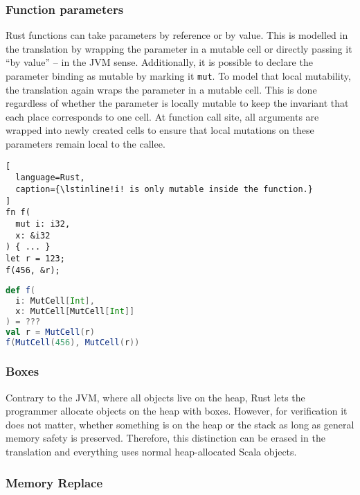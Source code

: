 \subsubsection{Function parameters}

Rust functions can take parameters by reference or by value. This is modelled in
the translation by wrapping the parameter in a mutable cell or directly passing
it ``by value'' -- in the JVM sense. Additionally, it is possible to declare the
parameter binding as mutable by marking it \passthrough{\lstinline!mut!}. To
model that local mutability, the translation again wraps the parameter in a
mutable cell. This is done regardless of whether the parameter is locally
mutable to keep the invariant that each place corresponds to one cell. At
function call site, all arguments are wrapped into newly created cells to ensure
that local mutations on these parameters remain local to the callee.

\noindent\begin{minipage}[t]{.45\textwidth}
\begin{lstlisting}[
  language=Rust,
  caption={\lstinline!i! is only mutable inside the function.}
]
fn f(
  mut i: i32,
  x: &i32
) { ... }
let r = 123;
f(456, &r);
\end{lstlisting}
\end{minipage}\hfill
\begin{minipage}[t]{.45\textwidth}
\begin{lstlisting}[language=Scala, caption={This results in nested cell in Scala.}]
def f(
  i: MutCell[Int],
  x: MutCell[MutCell[Int]]
) = ???
val r = MutCell(r)
f(MutCell(456), MutCell(r))
\end{lstlisting}
\end{minipage}

\subsubsection{Boxes}

Contrary to the JVM, where all objects live on the heap, Rust lets the
programmer allocate objects on the heap with boxes. However, for verification it
does not matter, whether something is on the heap or the stack as long as
general memory safety is preserved. Therefore, this distinction can be erased in
the translation and everything uses normal heap-allocated Scala objects.

\subsubsection{Memory Replace}

